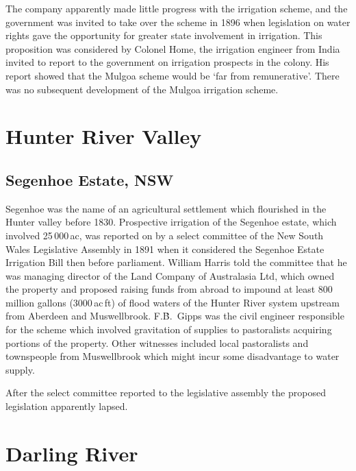 The company apparently made little progress with the irrigation
scheme, and the government was invited to take over the scheme in 1896
when legislation on water rights gave the opportunity for greater
state involvement in irrigation.  This proposition was considered by
Colonel Home, the irrigation engineer from India invited to report to
the government on irrigation prospects in the colony.  His report
showed that the Mulgoa scheme would be `far from remunerative'.  There was
no subsequent development of the Mulgoa irrigation scheme.

\section*{Hunter River Valley}

\subsection*{Segenhoe Estate, NSW}

Segenhoe was the name of an agricultural settlement which flourished
in the Hunter valley before 1830.  Prospective irrigation of the
Segenhoe estate, which involved 25\,000\,ac, was reported on by a
select committee of the New South Wales Legislative Assembly in 1891
when it considered the Segenhoe Estate Irrigation Bill then before
parliament.  William Harris told the committee that he was managing
director of the Land Company of Australasia Ltd, which owned the
property and proposed raising funds from abroad to impound at least
800 million gallons (3000\,ac\,ft) of flood waters of the Hunter River
system upstream from Aberdeen and Muswellbrook.  F.\.B.~Gipps was the
civil engineer responsible for the scheme which involved gravitation
of supplies to pastoralists acquiring portions of the property.  Other
witnesses included local pastoralists and townspeople from
Muswellbrook which might incur some disadvantage to water supply.

After the select committee reported to the legislative assembly the
proposed legislation apparently lapsed.

\section*{Darling River}

